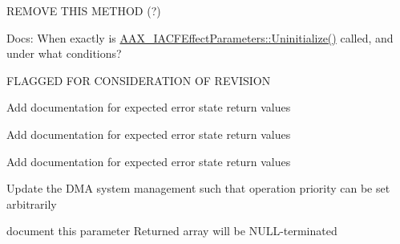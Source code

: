 \begin{DoxyRefList}
\label{a00878__todo000038}%
%
REMOVE THIS METHOD (?) 
\item[Member \mbox{\hyperlink{a02068_a711969adc95624fb9ac8a3e3b2c23696}{AAX\+\_\+\+IACFEffect\+Parameters\+::Uninitialize}} ()=0]\label{a00878__todo000034}%
%
Docs\+: When exactly is \mbox{\hyperlink{a02068_a711969adc95624fb9ac8a3e3b2c23696}{AAX\+\_\+\+IACFEffect\+Parameters\+::\+Uninitialize()}} called, and under what conditions? 
\item[Member \mbox{\hyperlink{a02068_a685858711efb8634ce66c327f2865c71}{AAX\+\_\+\+IACFEffect\+Parameters\+::Update\+Parameter\+Normalized\+Value}} (AAX\+\_\+\+CParam\+ID i\+Parameter\+ID, double i\+Value, AAX\+\_\+\+EUpdate\+Source i\+Source)=0]\label{a00878__todo000040}%
%
FLAGGED FOR CONSIDERATION OF REVISION 
\item[Class \mbox{\hyperlink{a02076}{AAX\+\_\+\+IACFEffect\+Parameters\+\_\+\+V2}} ]\label{a00878__todo000031}%
%
Add documentation for expected error state return values 
\item[Class \mbox{\hyperlink{a02080}{AAX\+\_\+\+IACFEffect\+Parameters\+\_\+\+V3}} ]\label{a00878__todo000032}%
%
Add documentation for expected error state return values 
\item[Class \mbox{\hyperlink{a02084}{AAX\+\_\+\+IACFEffect\+Parameters\+\_\+\+V4}} ]\label{a00878__todo000033}%
%
Add documentation for expected error state return values 
\item[Member \mbox{\hyperlink{a02216_aff9e1c726bbdf500f2d61b164589744e}{AAX\+\_\+\+IComponent\+Descriptor\+::Add\+Dma\+Instance}} (AAX\+\_\+\+CField\+Index in\+Field\+Index, \mbox{\hyperlink{a02252_af8d0f19f2896dd6dbd126b919b24e39b}{AAX\+\_\+\+IDma\+::\+EMode}} in\+Dma\+Mode)=0]\label{a00878__todo000041}%
%
Update the DMA system management such that operation priority can be set arbitrarily 
\item[Member \mbox{\hyperlink{a02216_a0e8f6217d0f317c728b3e30f15f181d2}{AAX\+\_\+\+IComponent\+Descriptor\+::Add\+Process\+Proc}} (\mbox{\hyperlink{a02316}{AAX\+\_\+\+IProperty\+Map}} $\ast$in\+Properties, AAX\+\_\+\+CSelector $\ast$out\+Proc\+IDs=NULL, int32\+\_\+t in\+Proc\+IDs\+Size=0)=0]\label{a00878__todo000044}%
%
document this parameter Returned array will be NULL-\/terminated 
\item[Member \mbox{\hyperlink{a02216_a1c069508cf54a523905c8160ebf628ad}{AAX\+\_\+\+IComponent\+Descriptor\+::Add\+Process\+Proc\+\_\+\+Native}} (AAX\+\_\+\+CProcess\+Proc in\+Process\+Proc, \mbox{\hyperlink{a02316}{AAX\+\_\+\+IProperty\+Map}} $\ast$in\+Properties=NULL, AAX\+\_\+\+CInstance\+Init\+Proc in\+Instance\+Init\+Proc=NULL, AAX\+\_\+\+CBackground\+Proc in\+Background\+Proc=NULL, AAX\+\_\+\+CSelector $\ast$out\+Proc\+ID=NULL)=0]\label{a00878__todo000042}%

\end{DoxyRefList}
